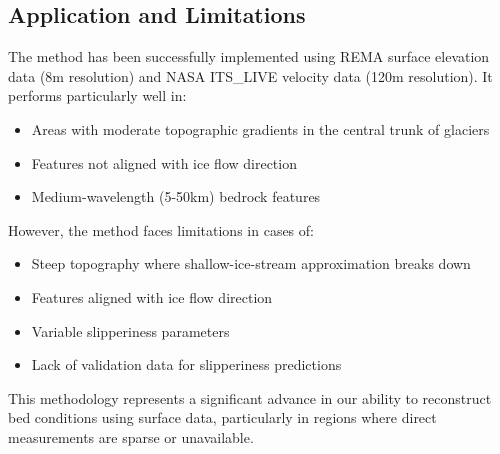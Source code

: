 \subsection*{Application and Limitations}

The method has been successfully implemented using REMA surface elevation data (8m resolution) and NASA ITS\_LIVE velocity data (120m resolution). It performs particularly well in:
\begin{itemize}
\item Areas with moderate topographic gradients in the central trunk of glaciers
\item Features not aligned with ice flow direction
\item Medium-wavelength (5-50km) bedrock features
\end{itemize}
However, the method faces limitations in cases of:
\begin{itemize}
\item Steep topography where shallow-ice-stream approximation breaks down
\item Features aligned with ice flow direction
\item Variable slipperiness parameters
\item Lack of validation data for slipperiness predictions
\end{itemize}
This methodology represents a significant advance in our ability to reconstruct bed conditions using surface data, particularly in regions where direct measurements are sparse or unavailable.


